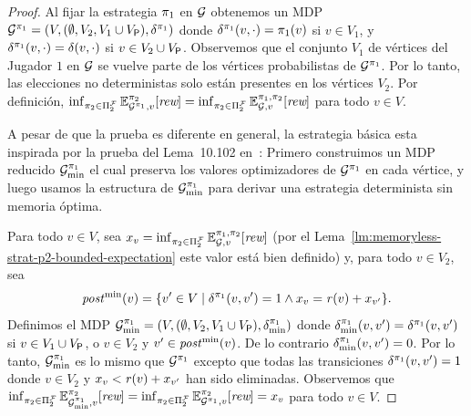 \begin{proof}
  Al fijar la estrategia $\pi_{1}$ en $\mathcal{G}$ obtenemos un MDP
  $\mathcal{G}^{\pi_{1}} = (V, (\emptyset,V_2,V_1\cup V_{\mathsf{P}}),\delta^{\pi_{1}})$
  donde $\delta^{\pi_{1}}(v,\cdot)=\pi_{1}(v)$ si $v\in V_1$, y
  $\delta^{\pi_{1}}(v,\cdot)=\delta(v,\cdot)$ si $v\in V_2\cup V_{\mathsf{P}}$.
  Observemos que el conjunto $V_1$ de vértices del Jugador $1$ en $\mathcal{G}$ se vuelve
  parte de los vértices probabilistas de $\mathcal{G}^{\pi_{1}}$.  Por lo tanto,
  las elecciones no deterministas solo están presentes en los vértices  $V_2$.
  Por definición,
  $\inf_{\pi_{2} \in \Pi^{\mathcal{F}}_{2}} \mathbb{E}^{\pi_{2}}_{\mathcal{G}^{\pi_{1}},v}[\textit{rew}] =
  \inf_{\pi_{2} \in \Pi^{\mathcal{F}}_{2}} \mathbb{E}^{\pi_{1}, \pi_{2}}_{\mathcal{G},v}[\textit{rew}]$
  para todo $v\in V$.

  A pesar de que la prueba es diferente en general, la estrategia básica esta inspirada por la prueba del Lema~10.102 en~\cite{BaierK08}: Primero construimos
  un MDP reducido $\mathcal{G}^{\pi_{1}}_{\min}$ el cual preserva los valores optimizadores de $\mathcal{G}^{\pi_{1}}$ en cada vértice, y luego usamos la estructura de $\mathcal{G}^{\pi_{1}}_{\min}$ para derivar una estrategia determinista sin memoria óptima.

  Para todo $v\in V$,
  sea $x_v = \inf_{\pi_{2} \in \Pi^{\mathcal{F}}_{2}} \mathbb{E}^{\pi_{1}, \pi_{2}}_{\mathcal{G},v}[\textit{rew}]$
  (por el Lema~\ref{lm:memoryless-strat-p2-bounded-expectation} este valor está bien definido) y,
  para todo $v\in V_2$, sea
  \begin{equation}\label{lm:infima-in-dmf-def-postmin}
 	\mathit{post}^{\min}(v) = \{{v'\in V} \mid {\delta^{\pi_{1}}(v,v')=1} \land {x_v=\mathit{r}(v)+x_{v'}}\}.
  \end{equation}
  Definimos el MDP
  $\mathcal{G}^{\pi_{1}}_{\min} = (V, (\emptyset,V_2,V_1\cup V_{\mathsf{P}}),\delta^{\pi_{1}}_{\min})$
  donde $\delta^{\pi_{1}}_{\min}(v,v')=\delta^{\pi_{1}}(v,v')$ si $v\in V_1\cup
  V_{\mathsf{P}}$, o $v\in V_2$ y $v'\in\mathit{post}^{\min}(v)$. De lo contrario
  $\delta^{\pi_{1}}_{\min}(v,v')=0$.
  Por lo tanto, $\mathcal{G}^{\pi_{1}}_{\min}$ es lo mismo que $\mathcal{G}^{\pi_{1}}$ excepto que todas las transiciones $\delta^{\pi_{1}}(v,v')=1$ donde $v\in V_2$ y
  $x_v < \mathit{r}(v)+x_{v'}$ han sido eliminadas.
  Observemos que
  $\inf_{\pi_{2} \in \Pi^{\mathcal{F}}_{2}} \mathbb{E}^{\pi_{2}}_{\mathcal{G}^{\pi_{1}}_{\min},v}[\textit{rew}] =
  \inf_{\pi_{2} \in \Pi^{\mathcal{F}}_{2}} \mathbb{E}^{\pi_{2}}_{\mathcal{G}^{\pi_{1}},v}[\textit{rew}] =
  x_v$
  para todo $v\in V$.


\end{proof}
